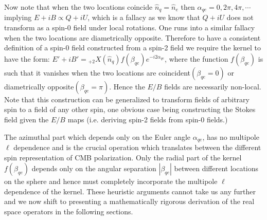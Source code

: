 Now note that when the two locations coincide $\hat{n}_q = \hat{n}_e$ then  $\alpha_{qe}=0,2\pi,4\pi,\cdots$ implying $E + iB \propto Q+iU$, which is a fallacy as we know that $Q+iU$ does not transform as a spin-0 field under local rotations. One runs into a similar fallacy when the two locations are diametrically opposite.  Therefore to have a consistent definition of a spin-0 field constructed from a spin-2 field we require the kernel to have the form: $E'+iB' = {}_{+2}X(\hat{n}_q) f(\beta_{qe})  e^{-i2\alpha_{qe}}$, where the function $f(\beta_{qe})$ is such that it vanishes when the two locations are coincident$(\beta_{qe}=0)$ or diametrically opposite$(\beta_{qe}=\pi)$. Hence the $E/B$ fields are necessarily non-local. Note that this construction can be generalized to transform fields of arbitrary spin to a field of any other spin, one obvious case being constructing the Stokes field given the $E/B$ maps (i.e. deriving spin-2 fields from spin-0 fields.)

The azimuthal part which depends only on the Euler angle $\alpha_{qe}$, has no multipole $\ell$ dependence and is the crucial operation which translates between the different spin representation of CMB polarization. Only the radial part of the kernel $f(\beta_{qe})$ depends only on the angular separation $|\beta_{qe}|$ between different locations on the sphere and hence must completely incorporate the multipole $\ell$ dependence of the kernel. These heuristic arguments cannot take us any further and we now shift to presenting a mathematically rigorous derivation of the real space operators in the following sections. 


